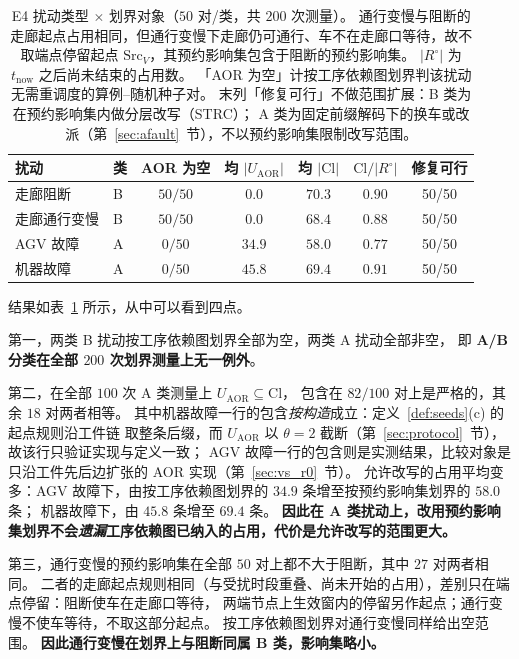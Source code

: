 \documentclass[manuscript,screen,review]{acmart}
\providecommand{\STRC}{\textsc{STRC}}
\newcommand{\NPairs}{50}
\newcommand{\StrictlyLarger}{82/100}
\newcommand{\FeasESixBlock}{\NPairs/\NPairs}
\newcommand{\FeasSlow}{\NPairs/\NPairs}
\newcommand{\FeasESixAgv}{\NPairs/\NPairs}
\newcommand{\FeasESixRa}{\NPairs/\NPairs}
\begin{document}
\begin{table}[t]
\centering
\caption{E4 扰动类型 \(\times\) 划界对象（\(\NPairs\) 对/类，共 \(200\) 次测量）。
通行变慢与阻断的走廊起点占用相同，但通行变慢下走廊仍可通行、车不在走廊口等待，故不取端点停留起点 \(\mathrm{Src}_V\)，其预约影响集包含于阻断的预约影响集。
\(|R^{\circ}|\) 为 \(t_{\mathrm{now}}\) 之后尚未结束的占用数。
「AOR 为空」计按工序依赖图划界判该扰动无需重调度的算例--随机种子对。
末列「修复可行」不做范围扩展：B 类为在预约影响集内做分层改写（\STRC{}）；
A 类为固定前缀解码下的换车或改派（第~\ref{sec:afault}~节），不以预约影响集限制改写范围。}
\label{tab:e6}
\small
\begin{tabular}{@{}llccccc@{}}
\toprule
扰动 & 类 & AOR 为空 & 均 \(|U_{\mathrm{AOR}}|\) & 均 \(|\mathrm{Cl}|\)
 & \(\mathrm{Cl}/|R^{\circ}|\) & 修复可行 \\
\midrule
走廊阻断   & B & \(50/50\) & \(0.0\)  & \(70.3\) & \(0.90\) & \FeasESixBlock \\
走廊通行变慢 & B & \(50/50\) & \(0.0\)  & \(68.4\) & \(0.88\) & \FeasSlow \\
AGV 故障   & A & \(0/50\)  & \(34.9\) & \(58.0\) & \(0.77\) & \FeasESixAgv \\
机器故障 & A & \(0/50\)  & \(45.8\) & \(69.4\) & \(0.91\) & \FeasESixRa \\
\bottomrule
\end{tabular}
\end{table}

结果如表~\ref{tab:e6} 所示，从中可以看到四点。

第一，两类 B 扰动按工序依赖图划界全部为空，两类 A 扰动全部非空，
即 \textbf{A/B 分类在全部 \(200\) 次划界测量上无一例外}。

第二，在全部 \(100\) 次 A 类测量上 \(U_{\mathrm{AOR}}\subseteq\mathrm{Cl}\)，
包含在 \(\StrictlyLarger\) 对上是严格的，其余 \(18\) 对两者相等。
其中机器故障一行的包含\emph{按构造}成立：定义~\ref{def:seeds}(c) 的起点规则沿工件链
取整条后缀，而 \(U_{\mathrm{AOR}}\) 以 \(\theta=2\) 截断（第~\ref{sec:protocol}~节），故该行只验证实现与定义一致；
AGV 故障一行的包含则是实测结果，比较对象是只沿工件先后边扩张的 AOR 实现（第~\ref{sec:vs_r0}~节）。
允许改写的占用平均变多：AGV 故障下，由按工序依赖图划界的 \(34.9\) 条增至按预约影响集划界的 \(58.0\) 条；
机器故障下，由 \(45.8\) 条增至 \(69.4\) 条。
\textbf{因此在 A 类扰动上，改用预约影响集划界不会\emph{遗漏}工序依赖图已纳入的占用，代价是允许改写的范围更大。}

第三，通行变慢的预约影响集在全部 \(50\) 对上都不大于阻断，其中 \(27\) 对两者相同。
二者的走廊起点规则相同（与受扰时段重叠、尚未开始的占用），差别只在端点停留：阻断使车在走廊口等待，
两端节点上生效窗内的停留另作起点；通行变慢不使车等待，不取这部分起点。
按工序依赖图划界对通行变慢同样给出空范围。
\textbf{因此通行变慢在划界上与阻断同属 B 类，影响集略小。}
\end{document}
